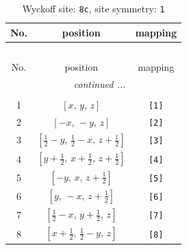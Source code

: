\documentclass[fleqn,8pt]{jsarticle}
\begin{document}
\renewcommand{\arraystretch}{1.2}
\begin{longtable}{ccc}
\caption{Wyckoff site: {\tt 8c}, site symmetry: {\tt 1}}
 \\
 \hline \hline
No. & position & mapping \\ \hline \endfirsthead

\multicolumn{2}{l}{\tablename\ \thetable{}} \\
 \hline \hline
No. & position & mapping \\ \hline \endhead

 \hline \hline
\multicolumn{2}{r}{\footnotesize\it continued ...} \\ \endfoot

 \hline \hline
\multicolumn{2}{r}{} \\ \endlastfoot

1 & $\left[ x,\, y,\, z \right]$ & {\tt [1]} \\ \hline
2 & $\left[ - x,\, - y,\, z \right]$ & {\tt [2]} \\ \hline
3 & $\left[ \frac{1}{2} - y,\, \frac{1}{2} - x,\, z + \frac{1}{2} \right]$ & {\tt [3]} \\ \hline
4 & $\left[ y + \frac{1}{2},\, x + \frac{1}{2},\, z + \frac{1}{2} \right]$ & {\tt [4]} \\ \hline
5 & $\left[ - y,\, x,\, z + \frac{1}{2} \right]$ & {\tt [5]} \\ \hline
6 & $\left[ y,\, - x,\, z + \frac{1}{2} \right]$ & {\tt [6]} \\ \hline
7 & $\left[ \frac{1}{2} - x,\, y + \frac{1}{2},\, z \right]$ & {\tt [7]} \\ \hline
8 & $\left[ x + \frac{1}{2},\, \frac{1}{2} - y,\, z \right]$ & {\tt [8]} \\
\end{longtable}
\end{document}
